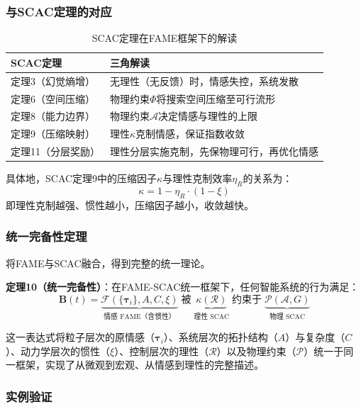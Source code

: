 \documentclass[12pt,a4paper]{article}
\theoremstyle{plain}
\newcommand{\ve}[1]{\bm{#1}}                    %
\newcommand{\Bvec}{\ve{B}}                        %
\begin{document}
\subsubsection{与SCAC定理的对应}

\begin{table}[h]
\centering
\caption{SCAC定理在FAME框架下的解读}
\begin{tabular}{ll}
\toprule
\textbf{SCAC定理} & \textbf{三角解读} \\
\midrule
定理3（幻觉熵增） & 无理性（无反馈）时，情感失控，系统发散 \\
定理6（空间压缩） & 物理约束$\Phi$将搜索空间压缩至可行流形 \\
定理8（能力边界） & 物理约束$\mathcal{A}$决定情感与理性的上限 \\
定理9（压缩映射） & 理性$\kappa$克制情感，保证指数收敛 \\
定理11（分层奖励） & 理性分层实施克制，先保物理可行，再优化情感 \\
\bottomrule
\end{tabular}
\end{table}

具体地，SCAC定理9中的压缩因子$\kappa$与理性克制效率$\eta_R$的关系为：
\begin{equation}
\kappa = 1 - \eta_R \cdot (1 - \xi)
\label{eq:kappa_eta}
\end{equation}
即理性克制越强、惯性越小，压缩因子越小，收敛越快。

\subsubsection{统一完备性定理}

将FAME与SCAC融合，得到完整的统一理论。

\textbf{定理10（统一完备性）}：在FAME-SCAC统一框架下，任何智能系统的行为满足：
\begin{equation}
\Bvec(t) = \underbrace{\mathcal{F}(\{\ve{\tau}_i\}, A, C, \xi)}_{\text{情感 FAME（含惯性）}} \; \text{被} \; \underbrace{\kappa(\mathcal{R})}_{\text{理性 SCAC}} \; \text{约束于} \; \underbrace{\mathcal{P}(\mathcal{A}, G)}_{\text{物理 SCAC}}
\label{eq:unified}
\end{equation}

这一表达式将粒子层次的原情感（$\ve{\tau}_i$）、系统层次的拓扑结构（$A$）与复杂度（$C$）、动力学层次的惯性（$\xi$）、控制层次的理性（$\mathcal{R}$）以及物理约束（$\mathcal{P}$）统一于同一框架，实现了从微观到宏观、从情感到理性的完整描述。

\subsubsection{实例验证}
\end{document}
